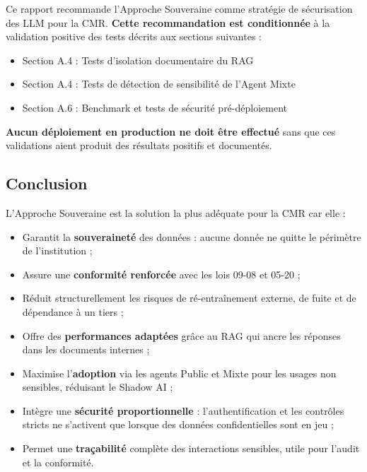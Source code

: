 \documentclass[12pt, a4paper]{report}
\begin{document}
\begin{tcolorbox}[
  enhanced,
  colback=white, colframe=primary,
  arc=4pt, boxrule=1.2pt,
  left=10pt, right=10pt, top=10pt, bottom=10pt,
  title={\large\bfseries Note Importante},
  fonttitle=\large\bfseries\color{white},
  coltitle=white,
  attach boxed title to top center={yshift=-2mm},
  boxed title style={colback=primary, rounded corners}
]
Ce rapport recommande l'Approche Souveraine comme stratégie de
sécurisation des LLM pour la CMR. \textbf{Cette recommandation est
conditionnée} à la validation positive des tests décrits aux sections
suivantes :

\vspace{0.3cm}
\begin{itemize}[leftmargin=2cm]
  \item Section A.4 : Tests d'isolation documentaire du RAG
  \item Section A.4 : Tests de détection de sensibilité de l'Agent Mixte
  \item Section A.6 : Benchmark et tests de sécurité pré-déploiement
\end{itemize}

\vspace{0.2cm}
\textbf{Aucun déploiement en production ne doit être effectué} sans que
ces validations aient produit des résultats positifs et documentés.
\end{tcolorbox}

\vspace{0.8cm}

\subsection{Conclusion}

L'Approche Souveraine est la solution la plus adéquate pour la CMR
car elle :

\begin{itemize}
  \item Garantit la \textbf{souveraineté} des données : aucune donnée
        ne quitte le périmètre de l'institution ;
  \item Assure une \textbf{conformité renforcée} avec les lois 09-08
        et 05-20 ;
  \item Réduit structurellement les risques de ré-entraînement externe,
        de fuite et de dépendance à un tiers ;
  \item Offre des \textbf{performances adaptées} grâce au RAG qui ancre
        les réponses dans les documents internes ;
  \item Maximise l'\textbf{adoption} via les agents Public et Mixte pour
        les usages non sensibles, réduisant le Shadow AI ;
  \item Intègre une \textbf{sécurité proportionnelle} : l'authentification
        et les contrôles stricts ne s'activent que lorsque des données
        confidentielles sont en jeu ;
  \item Permet une \textbf{traçabilité} complète des interactions
        sensibles, utile pour l'audit et la conformité.
\end{itemize}
\end{document}
